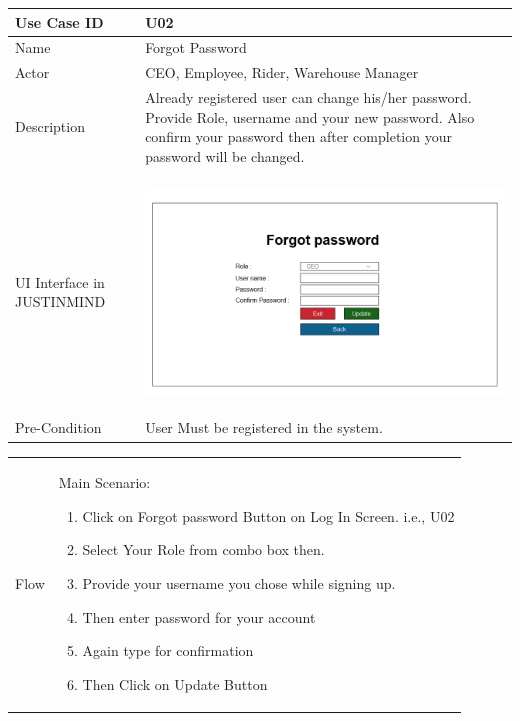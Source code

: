 \documentclass[12pt,a4paper]{report}
\begin{document}
\begin{tabular}{ | m{3cm} | m{12cm}| } \hline

Use Case ID & U02  \\\hline

Name  	    & Forgot Password  \\ \hline

Actor     	& CEO, Employee, Rider, Warehouse Manager \\ \hline

Description & Already registered user can change his/her password. Provide Role, username and your new password. Also confirm your password then after completion your password will be changed. \\ \hline

UI Interface in JUSTINMIND & \begin{center} \includegraphics[scale=0.3]{./UIs for Latex Reports/UI-003 Forgot password@1x.png}\end{center}  \\ \hline

Pre-Condition & User Must be registered in the system.   \\ \hline

\end{tabular} \newpage \begin{tabular}{ | m{3cm} | m{12cm}| }  \hline
Flow & Main Scenario:

\begin{enumerate}
\item   Click on Forgot password Button on Log In Screen. i.e., U02
\item Select Your Role from combo box then.
\item Provide your username you chose while signing up.
\item Then enter password for your account
\item Again type for confirmation
\item Then Click on Update Button
\end{enumerate}


\end{tabular}
\end{document}
